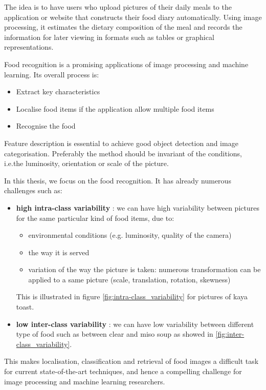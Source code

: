The idea is to have users who upload pictures of their daily meals to the application or website that constructs their food diary automatically. Using image processing, it estimates the dietary composition of the meal and records the information for later viewing in formats such as tables or graphical representations.

Food recognition is a promising applications of image processing and machine learning. Its overall process is:
\begin{itemize}
    \item Extract key characteristics
    \item Localise food items if the application allow multiple food items
    \item Recognise the food
\end{itemize}

Feature description is essential to achieve good object detection and image categorisation. Preferably the method should be invariant of the conditions, i.e.the luminosity, orientation or scale of the picture.

In this thesis, we focus on the food recognition. It has already numerous challenges such as:
\begin{itemize}
    \item \textbf{high intra-class variability} : we can have high variability between pictures for the same particular kind of food items, due to:
    \begin{itemize}
        \item environmental conditions (e.g. luminosity, quality of the camera)
        \item the way it is served
        \item variation of the way the picture is taken: numerous transformation can be applied to a same picture (scale, translation, rotation, skewness)
    \end{itemize}
    This is illustrated in figure \ref{fig:intra-class_variability} for pictures of kaya toast.
    
    \item \textbf{low inter-class variability} : we can have low variability between different type of food such as between clear and miso soup as showed in \ref{fig:inter-class_variability}.
\end{itemize}

This makes localisation, classification and retrieval of food images a difficult task for current state-of-the-art techniques, and hence a compelling challenge for image processing and machine learning researchers.

